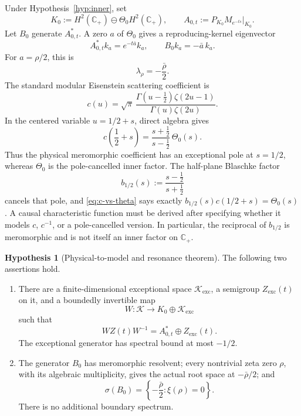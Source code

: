 \documentclass[11pt]{amsart}
\theoremstyle{definition}
\newtheorem{hypothesis}[theorem]{Hypothesis}
\theoremstyle{remark}
\newcommand{\C}{\mathbb C}
\newcommand{\Kcal}{\mathcal K}
\begin{document}
Under Hypothesis~\ref{hyp:inner}, set
\[
 K_{0}:=H^{2}(\C_{+})\ominus\Theta_{0}H^{2}(\C_{+}),
 \qquad
 A_{0,t}:=P_{K_{0}}M_{e^{-ts}}\big|_{K_{0}}.
\]
Let $B_{0}$ generate $A_{0,t}^{*}$.  A zero $a$ of $\Theta_{0}$ gives a
reproducing-kernel eigenvector
\[
 A_{0,t}^{*}k_{a}=e^{-t\bar a}k_{a},
 \qquad
 B_{0}k_{a}=-\bar a\,k_{a}.
\]
For $a=\rho/2$, this is
\[
 \lambda_{\rho}=-\frac{\bar\rho}{2}.
\]
The standard modular Eisenstein scattering coefficient is
\[
 c(u)=
 \sqrt{\pi}\,
 \frac{\Gamma(u-\frac12)\zeta(2u-1)}
      {\Gamma(u)\zeta(2u)}.
\]
In the centered variable $u=1/2+s$, direct algebra gives
\begin{equation}\label{eq:c-vs-theta}
 c\!\left(\frac12+s\right)
 =\frac{s+\frac12}{s-\frac12}\,\Theta_{0}(s).
\end{equation}
Thus the physical meromorphic coefficient has an exceptional pole at
$s=1/2$, whereas $\Theta_{0}$ is the pole-cancelled inner factor.  The
half-plane Blaschke factor
\[
 b_{1/2}(s):=\frac{s-\frac12}{s+\frac12}
\]
cancels that pole, and \eqref{eq:c-vs-theta} says exactly
$b_{1/2}(s)c(1/2+s)=\Theta_{0}(s)$.  A causal characteristic function must be
derived after specifying whether it models $c$, $c^{-1}$, or a pole-cancelled
version.  In particular, the reciprocal of $b_{1/2}$ is meromorphic and is not
itself an inner factor on $\C_{+}$.

\begin{hypothesis}[Physical-to-model and resonance theorem]\label{hyp:model}
The following two assertions hold.
\begin{enumerate}[label=(M\arabic*)]
\item There are a finite-dimensional exceptional space
$\Kcal_{\mathrm{exc}}$, a semigroup $Z_{\mathrm{exc}}(t)$ on it, and a
boundedly invertible map
\[
 W:\Kcal\longrightarrow K_{0}\oplus\Kcal_{\mathrm{exc}}
\]
such that
\begin{equation}\label{eq:intertwine}
 WZ(t)W^{-1}=A_{0,t}^{*}\oplus Z_{\mathrm{exc}}(t).
\end{equation}
The exceptional generator has spectral bound at most $-1/2$.
\item The generator $B_{0}$ has meromorphic resolvent; every nontrivial zeta
zero $\rho$, with its algebraic multiplicity, gives the actual root space at
$-\bar\rho/2$; and
\begin{equation}\label{eq:spectrum}
 \sigma(B_{0})
 =
 \left\{-\frac{\bar\rho}{2}:\xi(\rho)=0\right\}.
\end{equation}
There is no additional boundary spectrum.
\end{enumerate}
\end{hypothesis}
\end{document}

